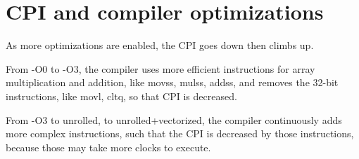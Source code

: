 \documentclass[12pt,letterpaper]{article}
\begin{document}
\section{CPI and compiler optimizations}
As more optimizations are enabled, the CPI goes down then climbs
up. 

From -O0 to -O3,  the compiler uses more efficient instructions for 
array multiplication and addition, like movss, mulss, addss, and 
removes the 32-bit instructions, like movl, cltq, so that CPI is 
decreased.

From -O3 to unrolled, to unrolled+vectorized, the compiler continuously
adds more complex instructions, such that the CPI is decreased by 
those instructions, because those may take more clocks to execute.
\end{document}
